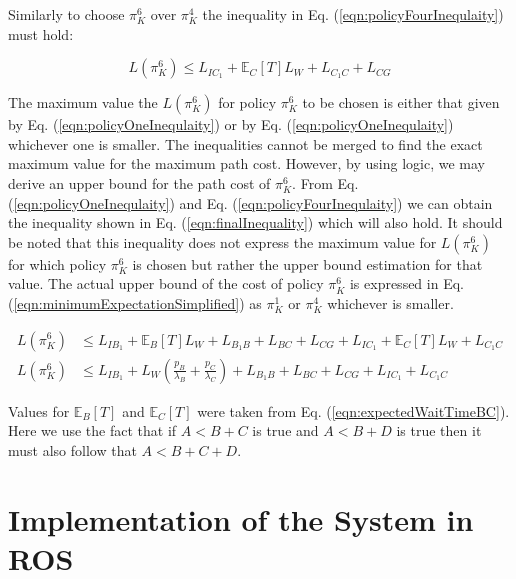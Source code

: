 \documentclass[a4paper,12pt]{article}
\begin{document}
			Similarly to choose $\pi_{K}^{6}$ over $\pi_{K}^{4}$ the inequality in Eq. (\ref{eqn:policyFourInequlaity}) must hold:
			
			\begin{equation}
			L\left(\pi_{K}^{6}\right) \leq L_{IC_1} + \mathbb{E}_{C}\left[T\right]L_W + L_{C_1C} + L_{CG}
			\label{eqn:policyFourInequlaity}
			\end{equation}
			
			The maximum value the $L\left(\pi_{K}^{6}\right)$ for policy $\pi_{K}^{6}$ to be chosen is either that given by Eq. (\ref{eqn:policyOneInequlaity}) or by Eq. (\ref{eqn:policyOneInequlaity}) whichever one is smaller. The inequalities cannot be merged to find the exact maximum value for the maximum path cost.  However, by using logic, we may derive an upper bound for the path cost of $\pi_{K}^{6}$. From Eq. (\ref{eqn:policyOneInequlaity}) and Eq. (\ref{eqn:policyFourInequlaity}) we can obtain the inequality shown in Eq. (\ref{eqn:finalInequality}) which will also hold. It should be noted that this inequality does not express the maximum value for $L\left(\pi_{K}^{6}\right)$ for which policy $\pi_{K}^{6}$ is chosen but rather the upper bound estimation for that value. The actual upper bound of the cost of policy $\pi_{K}^{6}$ is expressed in Eq. (\ref{eqn:minimumExpectationSimplified}) as $\pi_{K}^{1}$ or $\pi_{K}^{4}$ whichever is smaller.
			
			\begin{equation}
			\begin{split}
			L\left(\pi_{K}^{6}\right) &\leq L_{IB_1} + \mathbb{E}_{B}\left[T\right]L_W + L_{B_1B} + L_{BC} + L_{CG} + L_{IC_1} + \mathbb{E}_{C}\left[T\right]L_W + L_{C_1C} \\
			L\left(\pi_{K}^{6}\right) &\leq L_{IB_1} + L_W(\frac{p_B}{\lambda_{B}} + \frac{p_C}{\lambda_{C}}) + L_{B_1B} + L_{BC} + L_{CG} + L_{IC_1} + L_{C_1C}
			\end{split}
			\label{eqn:finalInequality}
			\end{equation}
			
			Values for $\mathbb{E}_{B}\left[T\right]$ and $\mathbb{E}_{C}\left[T\right]$ were taken from Eq. (\ref{eqn:expectedWaitTimeBC}). Here we use the fact that if $A<B+C$ is true and $A<B+D$ is true then it must also follow that $A<B+C+D$. 
	
	
	\section{Implementation of the System in ROS}
	\label{sec:implementationInROS}
	
\end{document}
